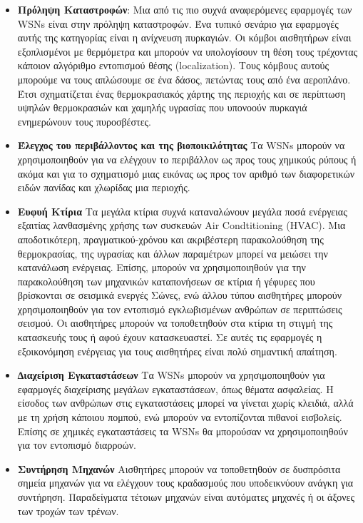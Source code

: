 \begin{itemize}
\item \textbf{Πρόληψη Καταστροφών}: Μια από τις πιο συχνά αναφερόμενες εφαρμογές των WSNs είναι στην πρόληψη καταστροφών.
Ένα τυπικό σενάριο για εφαρμογές αυτής της κατηγορίας είναι η ανίχνευση πυρκαγιών.
Οι κόμβοι αισθητήρων είναι εξοπλισμένοι με θερμόμετρα και μπορούν να υπολογίσουν τη θέση τους τρέχοντας κάποιον αλγόριθμο εντοπισμού θέσης (localization).
Τους κόμβους αυτούς μπορούμε να τους απλώσουμε σε ένα δάσος, πετώντας τους από ένα αεροπλάνο. Έτσι σχηματίζεται ένας θερμοκρασιακός χάρτης της
περιοχής και σε περίπτωση υψηλών θερμοκρασιών και χαμηλής υγρασίας που υπονοούν πυρκαγιά ενημερώνουν τους πυροσβέστες.
\item \textbf{Έλεγχος του περιβάλλοντος και της βιοποικιλότητας} Τα WSNs μπορούν να χρησιμοποιηθούν για να ελέγχουν το περιβάλλον ως προς τους χημικούς ρύπους
ή ακόμα και για το σχηματισμό μιας εικόνας ως προς τον αριθμό των διαφορετικών ειδών πανίδας και χλωρίδας μια περιοχής.
\item \textbf{Ευφυή Κτίρια} Τα μεγάλα κτίρια συχνά καταναλώνουν μεγάλα ποσά ενέργειας εξαιτίας λανθασμένης χρήσης των συσκευών Air Condtitioning (HVAC).
Μια αποδοτικότερη, πραγματικού-χρόνου και ακριβέστερη παρακολούθηση της θερμοκρασίας, της υγρασίας και άλλων παραμέτρων μπορεί να μειώσει την κατανάλωση ενέργειας.
Επίσης, μπορούν να χρησιμοποιηθούν για την παρακολούθηση των μηχανικών καταπονήσεων σε κτίρια ή γέφυρες που βρίσκονται σε σεισμικά ενεργές Σώνες, ενώ άλλου τύπου
αισθητήρες μπορούν χρησιμοποιηθούν για τον εντοπισμό εγκλωβισμένων ανθρώπων σε περιπτώσεις σεισμού.
Οι αισθητήρες μπορούν να τοποθετηθούν στα κτίρια τη στιγμή της κατασκευής τους ή αφού έχουν κατασκευαστεί.
Σε αυτές τις εφαρμογές η εξοικονόμηση ενέργειας για τους αισθητήρες είναι πολύ σημαντική απαίτηση.
\item \textbf{∆ιαχείριση Εγκαταστάσεων} Τα WSNs μπορούν να χρησιμοποιηθούν για εφαρμογές διαχείρισης μεγάλων εγκαταστάσεων, όπως θέματα ασφαλείας.
Η είσοδος των ανθρώπων στις εγκαταστάσεις μπορεί να γίνεται χωρίς κλειδιά, αλλά με τη χρήση κάποιου πομπού, ενώ μπορούν να εντοπίζονται πιθανοί εισβολείς.
Επίσης σε χημικές εγκαταστάσεις τα WSNs θα μπορούσαν να χρησιμοποιηθούν για τον εντοπισμό διαρροών.
\item \textbf{Συντήρηση Μηχανών} Αισθητήρες μπορούν να τοποθετηθούν σε δυσπρόσιτα σημεία μηχανών για να ελέγχουν τους κραδασμούς που υποδεικνύουν ανάγκη για
συντήρηση.
Παραδείγματα τέτοιων μηχανών είναι αυτόματες μηχανές ή οι άξονες των τροχών των τρένων.

\end{itemize}
